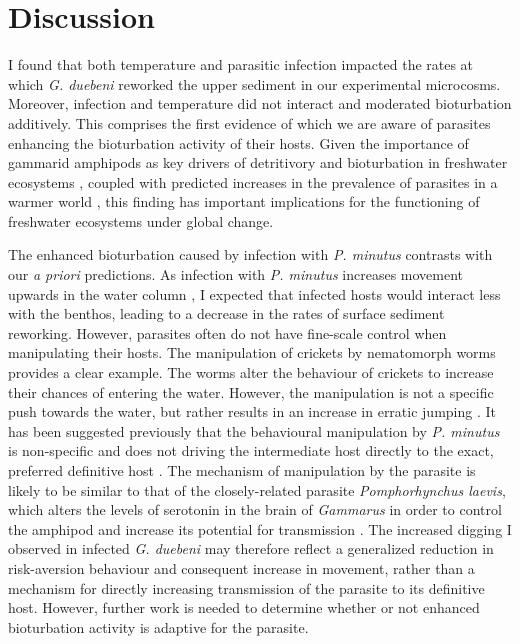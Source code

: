 \section{Discussion}

I found that both temperature and parasitic infection impacted the rates at which \emph{G. duebeni} reworked the upper sediment in our experimental microcosms. Moreover, infection and temperature did not interact and moderated bioturbation additively. This comprises the first evidence of which we are aware of parasites enhancing the bioturbation activity of their hosts. Given the importance of gammarid amphipods as key drivers of detritivory and bioturbation in freshwater ecosystems \citep{hunting2012}, coupled with predicted increases in the prevalence of parasites in a warmer world \citep{galaktionov2017}, this finding has important implications for the functioning of freshwater ecosystems under global change.

The enhanced bioturbation caused by infection with \emph{P. minutus} contrasts with our \emph{a priori} predictions. As infection with \emph{P. minutus} increases movement upwards in the water column \citep{jacquin2014, perrot2016, bailly2017}, I expected that infected hosts would interact less with the benthos, leading to a decrease in the rates of surface sediment reworking. However, parasites often do not have fine-scale control when manipulating their hosts. The manipulation of crickets by nematomorph worms provides a clear example. The worms alter the behaviour of crickets to increase their chances of entering the water. However, the manipulation is not a specific push towards the water, but rather results in an increase in erratic jumping \citep{thomas2002}. It has been suggested previously that the behavioural manipulation by \emph{P. minutus} is non-specific and does not driving the intermediate host directly to the exact, preferred definitive host \citep{jacquin2014}. The mechanism of manipulation by the parasite is likely to be similar to that of the closely-related parasite \emph{Pomphorhynchus laevis}, which alters the levels of serotonin in the brain of \emph{Gammarus} in order to control the amphipod and increase its potential for transmission \citep{kaldonski2007, perrot2014}. The increased digging I observed in infected \emph{G. duebeni} may therefore reflect a generalized reduction in risk-aversion behaviour and consequent increase in movement, rather than a mechanism for directly increasing transmission of the parasite to its definitive host. However, further work is needed to determine whether or not enhanced bioturbation activity is adaptive for the parasite. 

